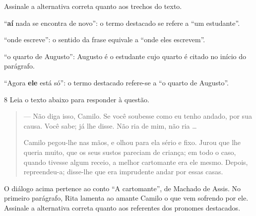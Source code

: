 Assinale a alternativa correta quanto aos trechos do texto.

\begin{escolha}
    
    \item ``\textbf{aí} nada se encontra de novo'': o termo destacado se refere a ``um estudante''.
    
    \item ``onde escreve'': o sentido da frase equivale a ``onde eles escrevem''.  
    
    \item ``o quarto de Augusto'': Augusto é o estudante cujo quarto é citado no início do parágrafo.  
    
    \item ``Agora \textbf{ele} está só'': o termo destacado refere-se a ``o quarto de Augusto''.   

\end{escolha}

\pagebreak

\num{8} Leia o texto abaixo para responder à questão. 


\begin{quote}

--- Não diga isso, Camilo. Se você soubesse como eu tenho andado, por sua
causa. Você sabe; já lhe disse. Não ria de mim, não ria \ldots{}

Camilo pegou-lhe nas mãos, e olhou para ela sério e fixo. Jurou que lhe
queria muito, que os seus sustos pareciam de criança; em todo o caso,
quando tivesse algum receio, a melhor cartomante era ele mesmo. Depois,
repreendeu-a; disse-lhe que era imprudente andar por essas casas.

\end{quote}


O diálogo acima pertence ao conto ``A cartomante'', de Machado de Assis.
No primeiro parágrafo, Rita lamenta ao amante Camilo o que vem 
sofrendo por ele. Assinale a alternativa correta quanto aos 
referentes dos pronomes destacados.  

